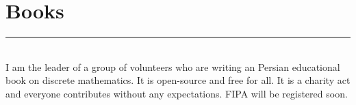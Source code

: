 \documentclass[]{rahulworld-resume}
\begin{document}
\begin{minipage}[t]{0.6\textwidth}
\section{Books}
\noindent\rule{11.5cm}{0.4pt}
 
\noindent
\hspace{5em}%
\begin{minipage}{0.85\textwidth\vspace{2pt}}
	\vspace{3pt}\\
	I am the leader of a group of volunteers who are writing an Persian educational book on discrete mathematics.
	It is open-source and free for all.
	It is a charity act and everyone contributes without any expectations.
	FIPA will be registered soon.\\
\end{minipage}
\end{minipage}
\newpage
%
%

\end{document}
